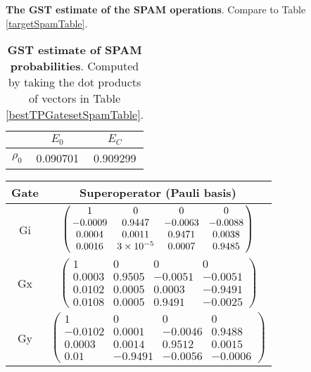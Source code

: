 {\begin{table}[h]
\begin{center}
\caption{\textbf{The GST estimate of the SPAM operations}.  Compare to Table \ref{targetSpamTable}.\label{bestTPGatesetSpamTable}}
\end{center}
\end{table}

\begin{table}[h]
\begin{center}
\begin{tabular}[l]{|c|c|c|}
\hline
 & $E_{0}$ & $E_C$ \\ \hline
$\rho_{0}$ & 0.090701 & 0.909299 \\ \hline
\end{tabular}

\caption{\textbf{GST estimate of SPAM probabilities}.  Computed by taking the dot products of vectors in Table \ref{bestTPGatesetSpamTable}.\label{bestTPGatesetSpamParametersTable}}
\end{center}
\end{table}

\begin{table}[h]
\begin{center}
\begin{tabular}[l]{|c|c|}
\hline
Gate & Superoperator (Pauli basis) \\ \hline
Gi & $ \left(\!\!\begin{array}{cccc}
1 & 0 & 0 & 0 \\ 
-0.0009 & 0.9447 & -0.0063 & -0.0088 \\ 
0.0004 & 0.0011 & 0.9471 & 0.0038 \\ 
0.0016 & 3\times 10^{-5} & 0.0007 & 0.9485
 \end{array}\!\!\right) $
 \\ \hline
Gx & $ \left(\!\!\begin{array}{cccc}
1 & 0 & 0 & 0 \\ 
0.0003 & 0.9505 & -0.0051 & -0.0051 \\ 
0.0102 & 0.0005 & 0.0003 & -0.9491 \\ 
0.0108 & 0.0005 & 0.9491 & -0.0025
 \end{array}\!\!\right) $
 \\ \hline
Gy & $ \left(\!\!\begin{array}{cccc}
1 & 0 & 0 & 0 \\ 
-0.0102 & 0.0001 & -0.0046 & 0.9488 \\ 
0.0003 & 0.0014 & 0.9512 & 0.0015 \\ 
0.01 & -0.9491 & -0.0056 & -0.0006
 \end{array}\!\!\right) $
 \\ \hline
\end{tabular}


\end{center}
\end{table}}
